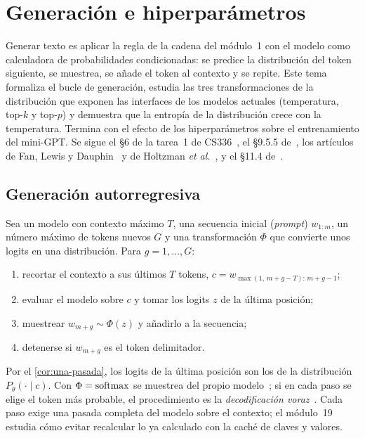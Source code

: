 \chapter{Generación e hiperparámetros}
\label{tema:5}

Generar texto es aplicar la regla de la cadena del módulo~1 con el modelo como calculadora de probabilidades condicionadas: se predice la distribución del token siguiente, se muestrea, se añade el token al contexto y se repite. Este tema formaliza el bucle de generación, estudia las tres transformaciones de la distribución que exponen las interfaces de los modelos actuales (temperatura, top-$k$ y top-$p$) y demuestra que la entropía de la distribución crece con la temperatura. Termina con el efecto de los hiperparámetros sobre el entrenamiento del mini-GPT. Se sigue el §6 de la tarea~1 de CS336~\cite{cs336}, el §9.5.5 de~\cite{d2l}, los artículos de Fan, Lewis y Dauphin~\cite{fan} y de Holtzman \emph{et al.}~\cite{holtzman}, y el §11.4 de~\cite{gbc}.

\section{Generación autorregresiva}

\begin{definicion}\label{def:generacion}
Sea un modelo con contexto máximo $T$, una secuencia inicial (\emph{prompt}) $w_{1:m}$, un número máximo de tokens nuevos $G$ y una transformación $\Phi$ que convierte unos logits en una distribución. Para $g=1,\dots,G$:
\begin{enumerate}[label=\arabic*.]
  \item recortar el contexto a sus últimos $T$ tokens, $c=w_{\max(1,\,m+g-T):\,m+g-1}$;
  \item evaluar el modelo sobre $c$ y tomar los logits $z$ de la última posición;
  \item muestrear $w_{m+g}\sim\Phi(z)$ y añadirlo a la secuencia;
  \item detenerse si $w_{m+g}$ es el token delimitador.
\end{enumerate}
\end{definicion}

Por el \cref{cor:una-pasada}, los logits de la última posición son los de la distribución $P_\theta(\cdot\mid c)$. Con $\Phi=\operatorname{softmax}$ se muestrea del propio modelo~\cite[§6, ecuaciones~(21)--(22)]{cs336}; si en cada paso se elige el token más probable, el procedimiento es la \emph{decodificación voraz}~\cite[§9.5.5]{d2l}. Cada paso exige una pasada completa del modelo sobre el contexto; el módulo~19 estudia cómo evitar recalcular lo ya calculado con la caché de claves y valores.

